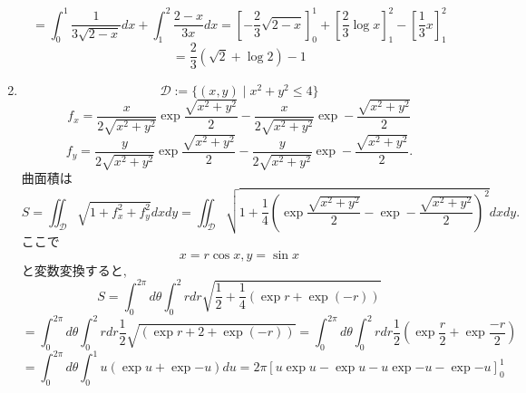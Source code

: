 \documentclass[a4paper,10pt,report]{amsart}
\theoremstyle{plain}
\theoremstyle{definition}
\theoremstyle{remark}
\begin{document}
\begin{enumerate}
\begin{equation*}
        \end{equation*}
        \begin{equation*}
            =\int_{0}^{1}\frac{1}{3\sqrt{2-x}}dx+\int_{1}^{2}\frac{2-x}{3x}dx={\left[-\frac{2}{3}\sqrt{2-x}\right]}_{0}^{1}+{\left[\frac{2}{3}\log{}x\right]}_{1}^{2}-{\left[\frac{1}{3}x\right]}_{1}^{2}
        \end{equation*}
        \begin{equation*}
            =\frac{2}{3}(\sqrt{2}+\log{2})-1
        \end{equation*}
        \item 
        \begin{equation*}
            \mathcal{D}:=\{(x,y)\mid{}x^{2}+y^{2}\leq4\}
        \end{equation*}
        \begin{equation*}
            f_{x}=\frac{x}{2\sqrt{x^{2}+y^{2}}}\exp{\frac{\sqrt{x^{2}+y^{2}}}{2}}-\frac{x}{2\sqrt{x^{2}+y^{2}}}\exp-{\frac{\sqrt{x^{2}+y^{2}}}{2}}
        \end{equation*}
        \begin{equation*}
            f_{y}=\frac{y}{2\sqrt{x^{2}+y^{2}}}\exp{\frac{\sqrt{x^{2}+y^{2}}}{2}}-\frac{y}{2\sqrt{x^{2}+y^{2}}}\exp-{\frac{\sqrt{x^{2}+y^{2}}}{2}}.
        \end{equation*}
        曲面積は
        \begin{equation*}
            S=\iint_{\mathcal{D}}\sqrt{1+f_{x}^{2}+f_{y}^{2}}dxdy=\iint_{\mathcal{D}}\sqrt{1+\frac{1}{4}{\left(\exp{\frac{\sqrt{x^{2}+y^{2}}}{2}}-\exp-{\frac{\sqrt{x^{2}+y^{2}}}{2}}\right)}^{2}}dxdy.
        \end{equation*}
        ここで
        \begin{equation*}
            x=r\cos{x},y=\sin{x}
        \end{equation*}
        と変数変換すると, 
        \begin{equation*}
            S=\int_{0}^{2\pi}d\theta\int_{0}^{2}rdr\sqrt{\frac{1}{2}+\frac{1}{4}\left(\exp{r}+\exp{(-r)}\right)}
        \end{equation*}
        \begin{equation*}
            =\int_{0}^{2\pi}d\theta\int_{0}^{2}rdr\frac{1}{2}\sqrt{\left(\exp{r}+2+\exp{(-r)}\right)}=\int_{0}^{2\pi}d\theta\int_{0}^{2}rdr\frac{1}{2}\left(\exp{\frac{r}{2}}+\exp{\frac{-r}{2}}\right)
        \end{equation*}
        \begin{equation*}
            =\int_{0}^{2\pi}d\theta\int_{0}^{1}u\left(\exp{u}+\exp{-u}\right)du=2\pi {[u\exp{u}-\exp{u}-u\exp{-u}-\exp{-u}]}_{0}^{1}

\end{equation*}
\end{enumerate}
\end{document}
